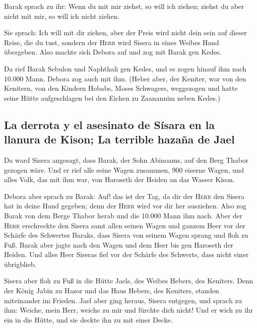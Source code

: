  Barak sprach zu ihr: Wenn du mit mir ziehst, so will ich
ziehen; ziehst du aber nicht mit mir, so will ich nicht ziehen.

 Sie sprach: Ich will mit dir ziehen, aber der Preis wird
nicht dein sein auf dieser Reise, die du tust, sondern der \textsc{Herr}
wird Sisera in eines Weibes Hand übergeben. Also machte sich Debora auf
und zog mit Barak gen Kedes.

 Da rief Barak Sebulon und Naphthali gen Kedes, und es
zogen hinauf ihm nach 10.000 Mann. Debora zog auch mit ihm.
 (Heber aber, der Keniter, war von den Kenitern, von den
Kindern Hobabs, Moses Schwagers, weggezogen und hatte seine Hütte
aufgeschlagen bei den Eichen zu Zaanannim neben Kedes.)

\hypertarget{la-derrota-y-el-asesinato-de-suxedsara-en-la-llanura-de-kison-la-terrible-hazauxf1a-de-jael}{%
\subsection{La derrota y el asesinato de Sísara en la llanura de Kison;
La terrible hazaña de
Jael}\label{la-derrota-y-el-asesinato-de-suxedsara-en-la-llanura-de-kison-la-terrible-hazauxf1a-de-jael}}

 Da ward Sisera angesagt, dass Barak, der Sohn Abinoams,
auf den Berg Thabor gezogen wäre.  Und er rief alle seine
Wagen zusammen, 900 eiserne Wagen, und alles Volk, das mit ihm war, von
Haroseth der Heiden an das Wasser Kison.

 Debora aber sprach zu Barak: Auf! das ist der Tag, da
dir der \textsc{Herr} den Sisera hat in deine Hand gegeben; denn der
\textsc{Herr} wird vor dir her ausziehen. Also zog Barak von dem Berge
Thabor herab und die 10.000 Mann ihm nach.  Aber der
\textsc{Herr} erschreckte den Sisera samt allen seinen Wagen und ganzem
Heer vor der Schärfe des Schwertes Baraks, dass Sisera von seinem Wagen
sprang und floh zu Fuß.  Barak aber jagte nach den Wagen
und dem Heer bis gen Haroseth der Heiden. Und alles Heer Siseras fiel
vor der Schärfe des Schwerts, dass nicht einer übrigblieb.

 Sisera aber floh zu Fuß in die Hütte Jaels, des Weibes
Hebers, des Keniters. Denn der König Jabin zu Hazor und das Haus Hebers,
des Keniters, standen miteinander im Frieden.  Jael aber
ging heraus, Sisera entgegen, und sprach zu ihm: Weiche, mein Herr,
weiche zu mir und fürchte dich nicht! Und er wich zu ihr ein in die
Hütte, und sie deckte ihn zu mit einer Decke.

